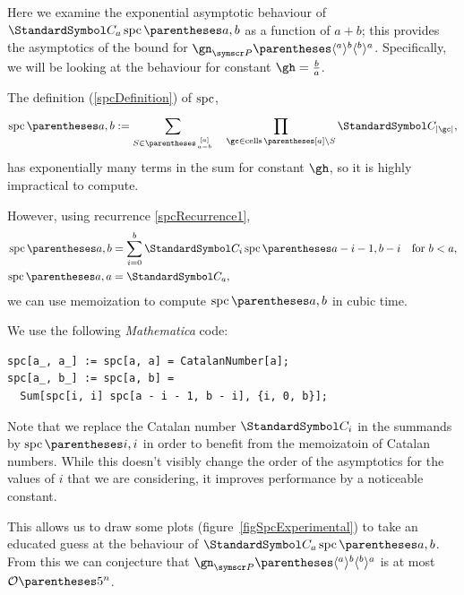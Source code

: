 Here we examine the exponential asymptotic behaviour of $\CatalanNumber a\spc\of{a,b}$ as a
function of $a+b$; this provides the asymptotics of the bound for
$\gn_{\pointset P}\of{\langle^a\rangle^b\langle^b\rangle^a}$. Specifically, we will be looking
at the behaviour for constant $\gh=\frac{b}{a}$.

The definition (\ref{spcDefinition}) of $\operatorname{spc}$,\begin{equation*}
\spc\of{a,b}\DefineAs
\sum{S\in\binom{[a]}{a-b}} \quad \prod{\gc\in\cells\of{[a] \setminus S}}\CatalanNumber {\Cardinality \gc}
\text,
\end{equation*}
has exponentially many terms in the sum for constant $\gh$, so it is highly impractical to compute.

However, using recurrence \ref{spcRecurrence1},
\begin{align*}\spc\of{a,b} &= \sum{i=0}[b]
\CatalanNumber {i}
\spc\of{a-i-1,b-i} &\text{for $b<a$,} \\
\spc\of{a,a} &= \CatalanNumber a \text,
\end{align*}
we can use memoization to compute $\spc\of{a,b}$ in cubic time.

We use the following \emph{Mathematica} code:
\begin{verbatim}
spc[a_, a_] := spc[a, a] = CatalanNumber[a];
spc[a_, b_] := spc[a, b] =
  Sum[spc[i, i] spc[a - i - 1, b - i], {i, 0, b}];
\end{verbatim}
Note that we replace the Catalan number $\CatalanNumber i$ in the summands by $\spc\of{i,i}$ in
order to benefit from the memoizatoin of Catalan numbers. While this doesn't visibly change the
order of the asymptotics for the values of $i$ that we are considering, it improves performance by
a noticeable constant.

This allows us to draw some plots (figure~\ref{figSpcExperimental}) to take an educated guess at
the behaviour of $\CatalanNumber a\spc\of{a,b}$. From this we can conjecture that
$\gn_{\pointset P}\of{\langle^a\rangle^b\langle^b\rangle^a}$ is at most $\BigO\of{5^n}$.


